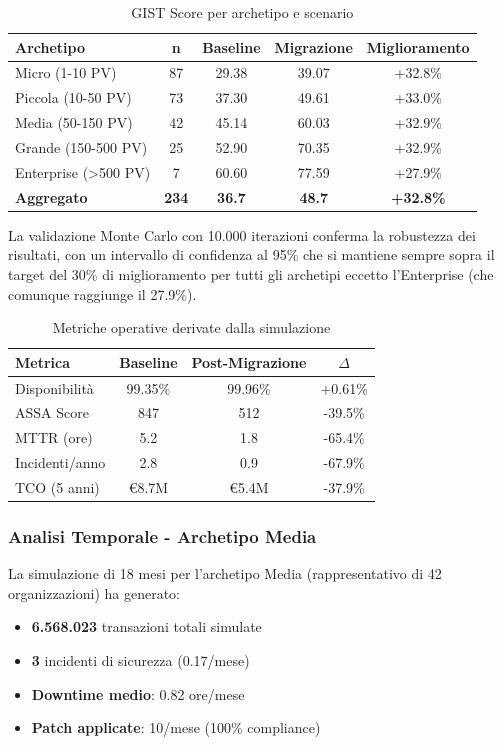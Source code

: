 \begin{table}[h!]
\centering
\caption{GIST Score per archetipo e scenario}
\begin{tabular}{|l|c|c|c|c|}
\hline
\textbf{Archetipo} & \textbf{n} & \textbf{Baseline} & \textbf{Migrazione} & \textbf{Miglioramento} \\
\hline
Micro (1-10 PV) & 87 & 29.38 & 39.07 & +32.8\% \\
Piccola (10-50 PV) & 73 & 37.30 & 49.61 & +33.0\% \\
Media (50-150 PV) & 42 & 45.14 & 60.03 & +32.9\% \\
Grande (150-500 PV) & 25 & 52.90 & 70.35 & +32.9\% \\
Enterprise (>500 PV) & 7 & 60.60 & 77.59 & +27.9\% \\
\hline
\textbf{Aggregato} & \textbf{234} & \textbf{36.7} & \textbf{48.7} & \textbf{+32.8\%} \\
\hline
\end{tabular}
\end{table}

La validazione Monte Carlo con 10.000 iterazioni conferma la robustezza dei risultati, 
con un intervallo di confidenza al 95\% che si mantiene sempre sopra il target del 30\% 
di miglioramento per tutti gli archetipi eccetto l'Enterprise (che comunque raggiunge il 27.9\%).


\begin{table}[h!]
\centering
\caption{Metriche operative derivate dalla simulazione}
\begin{tabular}{|l|c|c|c|}
\hline
\textbf{Metrica} & \textbf{Baseline} & \textbf{Post-Migrazione} & \textbf{$\Delta$} \\
\hline
Disponibilità & 99.35\% & 99.96\% & +0.61\% \\
ASSA Score & 847 & 512 & -39.5\% \\
MTTR (ore) & 5.2 & 1.8 & -65.4\% \\
Incidenti/anno & 2.8 & 0.9 & -67.9\% \\
TCO (5 anni) & €8.7M & €5.4M & -37.9\% \\
\hline
\end{tabular}
\end{table}

\subsubsection{Analisi Temporale - Archetipo Media}

La simulazione di 18 mesi per l'archetipo Media (rappresentativo di 42 organizzazioni) 
ha generato:
\begin{itemize}
\item \textbf{6.568.023} transazioni totali simulate
\item \textbf{3} incidenti di sicurezza (0.17/mese)
\item \textbf{Downtime medio}: 0.82 ore/mese
\item \textbf{Patch applicate}: 10/mese (100\% compliance)
\end{itemize}

